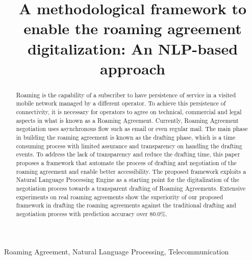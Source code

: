 \documentclass[conference]{style/IEEEtran}
\begin{document}
\title{A methodological framework to enable the roaming agreement digitalization: An NLP-based approach\\}

\maketitle

\begin{abstract}
Roaming is the capability of a subscriber to have persistence of service in a visited mobile network managed by a different operator. To achieve this persistence of connectivity, it is necessary for operators to agree on technical, commercial and legal aspects in what is known as a Roaming Agreement. Currently, Roaming Agreement negotiation uses asynchronous flow such as email or even regular mail. 
The main phase in building the roaming agreement is known as the drafting phase, which is a time consuming process with limited assurance and transparency on handling the drafting events. To address the lack of transparency and reduce the drafting time, this paper proposes a framework that automate the process of drafting and negotiation of the roaming agreement and enable better accessibility. The proposed framework exploits a Natural Language Processing Engine as a starting point for the digitalization of the negotiation process towards a transparent drafting of Roaming Agreements. Extensive experiments on real roaming agreements show the superiority of our proposed framework in drafting the roaming agreements against the traditional drafting and negotiation process with prediction accuracy over 80.0\%.
\end{abstract}

\begin{IEEEkeywords}
Roaming Agreement, Natural Language Processing, Telecommunication
\end{IEEEkeywords}







\printbibliography
\end{document}
